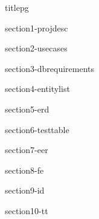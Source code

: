 \documentclass{article}
\begin{document}
{titlepg}

\tableofcontents
\pagebreak

{section1-projdesc}

{section2-usecases}

{section3-dbrequirements}

{section4-entitylist}

{section5-erd}

{section6-testtable}

{section7-eer}

{section8-fe}

{section9-id}

{section10-tt}
\end{document}
